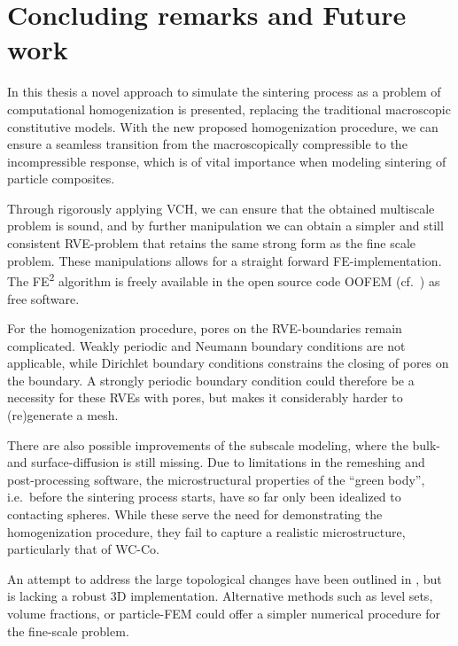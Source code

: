 \documentclass[MikaelDissertation.tex]{subfiles}
\begin{document}
\chapter{Concluding remarks and Future work}

In this thesis a novel approach to simulate the sintering process as a problem of computational homogenization is presented, replacing the traditional macroscopic constitutive models.
With the new proposed homogenization procedure, we can ensure a seamless transition from the macroscopically compressible to the incompressible response, which is of vital importance when modeling sintering of particle composites.

Through rigorously applying VCH, we can ensure that the obtained multiscale problem is sound, and by further manipulation we can obtain a simpler and still consistent RVE-problem that retains the same strong form as the fine scale problem.
These manipulations allows for a straight forward FE-implementation.
The FE\textsuperscript{2} algorithm is freely available in the open source code OOFEM (cf.\ \cite{patzak_oofem_2000}) as free software.

For the homogenization procedure, pores on the RVE-boundaries remain complicated.
Weakly periodic and Neumann boundary conditions are not applicable, while Dirichlet boundary conditions constrains the closing of pores on the boundary.
A strongly periodic boundary condition could therefore be a necessity for these RVEs with pores, but makes it considerably harder to (re)generate a mesh.


There are also possible improvements of the subscale modeling, where the bulk- and surface-diffusion is still missing.
Due to limitations in the remeshing and post-processing software, the microstructural properties of the ``green body'', i.e.\ before the sintering process starts, have so far only been idealized to contacting spheres.
While these serve the need for demonstrating the homogenization procedure, they fail to capture a realistic microstructure, particularly that of WC-Co.

An attempt to address the large topological changes have been outlined in , but is lacking a robust 3D implementation.
Alternative methods such as level sets, volume fractions, or particle-FEM could offer a simpler numerical procedure for the fine-scale problem.
\end{document}
